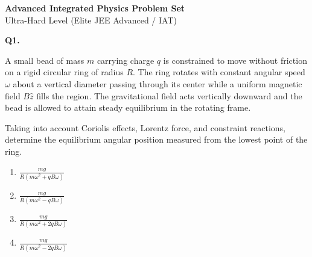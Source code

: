 \documentclass[12pt]{article}
\begin{document}
\begin{center}
\Large \textbf{Advanced Integrated Physics Problem Set}\\
\large Ultra-Hard Level (Elite JEE Advanced / IAT)
\end{center}

\bigskip


\textbf{Q1.}

A small bead of mass $m$ carrying charge $q$ is constrained to move without friction on a rigid circular ring of radius $R$. The ring rotates with constant angular speed $\omega$ about a vertical diameter passing through its center while a uniform magnetic field $B\hat z$ fills the region. The gravitational field acts vertically downward and the bead is allowed to attain steady equilibrium in the rotating frame.

Taking into account Coriolis effects, Lorentz force, and constraint reactions, determine the equilibrium angular position measured from the lowest point of the ring.

\begin{center}
\end{center}

\begin{enumerate}
\item[(A)] $\displaystyle \frac{mg}{R(m\omega^2+qB\omega)}$
\item[(B)] $\displaystyle \frac{mg}{R(m\omega^2-qB\omega)}$
\item[(C)] $\displaystyle \frac{mg}{R(m\omega^2+2qB\omega)}$
\item[(D)] $\displaystyle \frac{mg}{R(m\omega^2-2qB\omega)}$
\end{enumerate}
\end{document}
